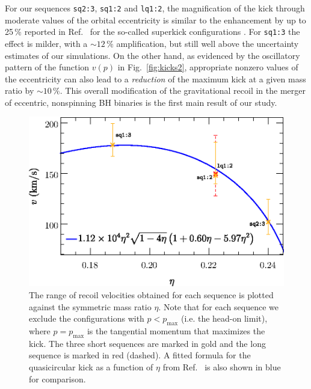 \documentclass[floats,floatfix,showpacs,amssymb,physrev,twocolumn,superscriptaddress,reprint,
nofootinbib, longbibliography]{revtex4-2}
\begin{document}
For our sequences \texttt{sq2:3}, \texttt{sq1:2} and
\texttt{lq1:2}, the 
magnification of the kick through moderate values
of the orbital eccentricity is similar to the
enhancement by up to 25\,\% reported in
Ref.~\cite{Sperhake:2019wwo}
for the so-called superkick configurations
\cite{Gonzalez:2007hi,Campanelli:2007cga}.
For \texttt{sq1:3} the effect is milder, with a
$\sim 12\,\%$ amplification, but still well above
the uncertainty estimates of our simulations.
On the other hand, as evidenced by the oscillatory pattern
of the function $v(p)$ in Fig.~\ref{fig:kicks2}, appropriate
nonzero values of the eccentricity can also
lead to a {\it reduction} of the maximum kick at a given mass ratio
by $\sim 10\,\%$.
This overall modification of the gravitational recoil
in the merger of eccentric, nonspinning BH binaries
is the first main result of our study.

\begin{figure}[t]
    \centering
    \includegraphics[width=\columnwidth]{quasicircular-fit2.eps}
    \caption{The range of recoil velocities obtained for each sequence
    is plotted against the symmetric mass ratio $\eta$. Note that for
    each sequence we exclude the configurations with 
    $p<p_{\text{max}}$ (i.e. the head-on limit), where 
    $p=p_{\text{max}}$ is the tangential momentum that maximizes the kick.
    The three short sequences are marked in gold and the long sequence is 
    marked in red (dashed). A fitted formula for the quasicircular
    kick as a function of $\eta$ from Ref.~\cite{Healy:2017mvh} is
    also shown in blue for comparison. 
    }
    \label{fig:quasicircular-fit-comparison}
\end{figure}
\end{document}
